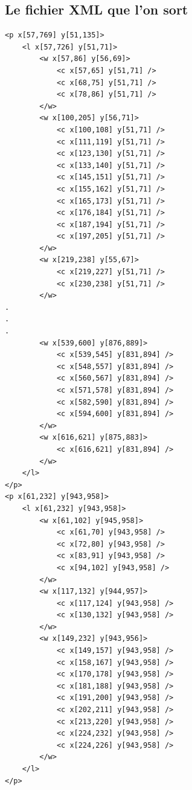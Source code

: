 \documentclass[a4paper,12pt]{report}
\begin{document}
\subsection{Le fichier XML que l'on sort} %
\label{sub:le_fichier_xml_que_l_on_sort}
\begin{lstlisting}
<p x[57,769] y[51,135]>
	<l x[57,726] y[51,71]>
		<w x[57,86] y[56,69]>
			<c x[57,65] y[51,71] />
			<c x[68,75] y[51,71] />
			<c x[78,86] y[51,71] />
		</w>
		<w x[100,205] y[56,71]>
			<c x[100,108] y[51,71] />
			<c x[111,119] y[51,71] />
			<c x[123,130] y[51,71] />
			<c x[133,140] y[51,71] />
			<c x[145,151] y[51,71] />
			<c x[155,162] y[51,71] />
			<c x[165,173] y[51,71] />
			<c x[176,184] y[51,71] />
			<c x[187,194] y[51,71] />
			<c x[197,205] y[51,71] />
		</w>
		<w x[219,238] y[55,67]>
			<c x[219,227] y[51,71] />
			<c x[230,238] y[51,71] />
		</w>
.
.
.
		<w x[539,600] y[876,889]>
			<c x[539,545] y[831,894] />
			<c x[548,557] y[831,894] />
			<c x[560,567] y[831,894] />
			<c x[571,578] y[831,894] />
			<c x[582,590] y[831,894] />
			<c x[594,600] y[831,894] />
		</w>
		<w x[616,621] y[875,883]>
			<c x[616,621] y[831,894] />
		</w>
	</l>
</p>
<p x[61,232] y[943,958]>
	<l x[61,232] y[943,958]>
		<w x[61,102] y[945,958]>
			<c x[61,70] y[943,958] />
			<c x[72,80] y[943,958] />
			<c x[83,91] y[943,958] />
			<c x[94,102] y[943,958] />
		</w>
		<w x[117,132] y[944,957]>
			<c x[117,124] y[943,958] />
			<c x[130,132] y[943,958] />
		</w>
		<w x[149,232] y[943,956]>
			<c x[149,157] y[943,958] />
			<c x[158,167] y[943,958] />
			<c x[170,178] y[943,958] />
			<c x[181,188] y[943,958] />
			<c x[191,200] y[943,958] />
			<c x[202,211] y[943,958] />
			<c x[213,220] y[943,958] />
			<c x[224,232] y[943,958] />
			<c x[224,226] y[943,958] />
		</w>
	</l>
</p>	
\end{lstlisting}
\end{document}
